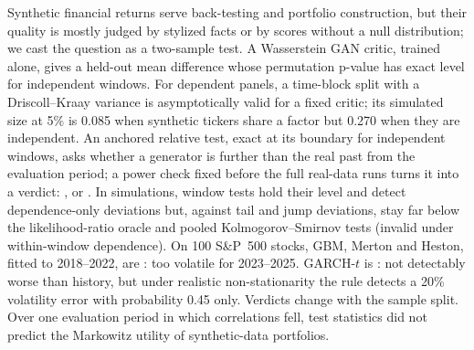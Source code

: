 Synthetic financial returns serve back-testing and portfolio construction, but their quality is
mostly judged by stylized facts or by scores without a null distribution; we cast the question
as a two-sample test. A Wasserstein GAN critic, trained alone, gives a held-out mean difference whose
permutation p-value has exact level for independent windows. For dependent panels, a time-block
split with a Driscoll--Kraay variance is asymptotically valid for a fixed critic; its simulated
size at 5\% is 0.085 when synthetic tickers share a factor but 0.270 when they are independent. An
anchored relative test, exact at its boundary for independent windows, asks whether a generator
is further than the real past from the evaluation period; a power check fixed before the full
real-data runs turns it into a verdict: \GOOD, \BAD{} or \INCONCL. In simulations, window tests
hold their level and detect dependence-only deviations but, against tail and jump deviations,
stay far below the likelihood-ratio oracle and pooled Kolmogorov--Smirnov tests (invalid under
within-window dependence). On 100 S\&P~500 stocks, GBM, Merton and Heston, fitted to 2018--2022,
are \BAD{}: too volatile for 2023--2025. GARCH-$t$ is \INCONCL{}: not detectably worse than
history, but under realistic non-stationarity the rule detects a 20\% volatility error with
probability 0.45 only. Verdicts change with the sample split. Over one evaluation period in which
correlations fell, test statistics did not predict the Markowitz utility of synthetic-data
portfolios.

